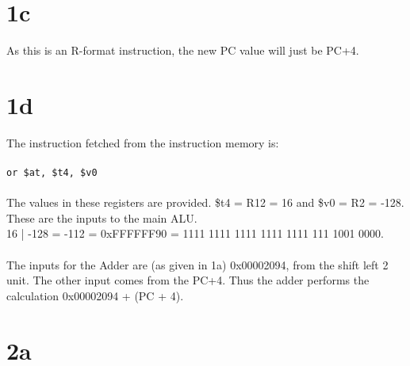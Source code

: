 \documentclass[10pt,a4paper]{article}
\begin{document}
	\section*{1c}
	As this is an R-format instruction, the new PC value will just be PC+4.
	\section*{1d}
	The instruction fetched from the instruction memory is: \\\\
	\verb|or $at, $t4, $v0| \\\\
	The values in these registers are provided. \$t4 = R12 = 16 and \$v0 = R2 = -128. These are the inputs to the main ALU.\\
	16 | -128 = -112 = 0xFFFFFF90 = 1111 1111 1111 1111 1111 111 1001 0000.\\\\
	The inputs for the Adder are (as given in 1a) 0x00002094, from the shift left 2 unit. The other input comes from the PC+4. Thus the adder performs the calculation 0x00002094 + (PC + 4).
	\section*{2a}
\end{document}
